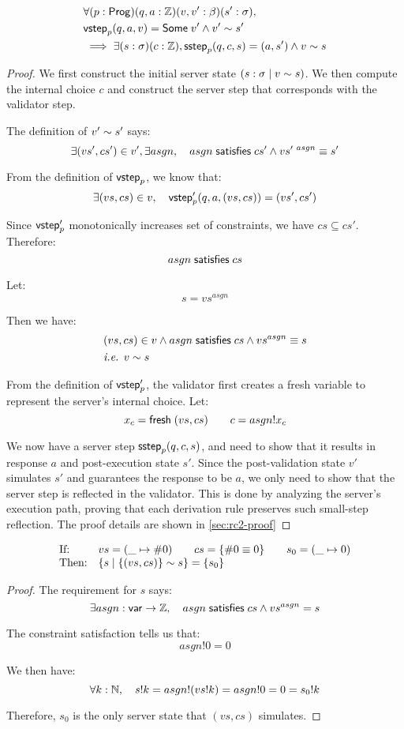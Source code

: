 \begin{lemma}[\ref{eq:rc2}]
\begin{align*}
&\forall(p:\mathsf{Prog})(q,a:\mathbb Z)(v,v':\beta)(s':\sigma),\\
&\mathsf{vstep}_p(q,a,v)=\mathsf{Some}\;v'\wedge v'\sim s'\\
&\implies\exists(s:\sigma)(c:\mathbb Z),\mathsf{sstep}_p(q,c,s)=(a,s')\wedge v\sim s
\end{align*}
\begin{proof}
We first construct the initial server state $(s:\sigma\mid v\sim s)$.  We
then compute the internal choice $c$ and construct the server step that
corresponds with the validator step.

The definition of $v'\sim s'$ says:
\[\exists (vs',cs')\in v',\exists asgn,\quad asgn\;\mathsf{satisfies}\;cs'\wedge vs'^{~asgn}\equiv s'\]

From the definition of $\mathsf{vstep}_p$, we know that:
\[\exists (vs,cs)\in v,\quad \mathsf{vstep}'_p(q,a,(vs,cs))=(vs',cs')\]

Since $\mathsf{vstep}'_p$ monotonically increases set of constraints, we have
$cs\subseteq cs'$.  Therefore: \[asgn\;\mathsf{satisfies}\;cs\]

Let: \[s=vs^{asgn}\]

Then we have:
\begin{align*}
&(vs,cs)\in v\wedge asgn\;\mathsf{satisfies}\;cs\wedge vs^{asgn}\equiv s\\
&\textit{i.e. }v\sim s
\end{align*}

From the definition of $\mathsf{vstep}'_p$, the validator first creates a fresh variable
to represent the server's internal choice.  Let:
\[x_c=\mathsf{fresh}\;(vs,cs)\qquad c=asgn!x_c\]

We now have a server step $\mathsf{sstep}_p(q,c,s)$, and need to show that it results in
response $a$ and post-execution state $s'$.  Since the post-validation state
$v'$ simulates $s'$ and guarantees the response to be $a$, we only need to show
that the server step is reflected in the validator.  This is done by analyzing
the server's execution path, proving that each derivation rule preserves such
small-step reflection.  The proof details are shown in \autoref{sec:rc2-proof}
\end{proof}
\end{lemma}

\begin{lemma}[\ref{eq:rc3}]
\[\begin{array}{ll}
\text{If:}&
vs=(\_\mapsto\#0)\qquad
cs=\{\#0\equiv0\}\qquad
s_0=(\_\mapsto0)\\
\text{Then:}&\{s\mid\{(vs,cs)\}\sim s\}=\{s_0\}
\end{array}\]
\begin{proof}
The requirement for $s$ says:
\[\exists asgn:\mathsf{var}\to\mathbb Z,\quad asgn\;\mathsf{satisfies}\;cs\wedge vs^{asgn}=s\]

The constraint satisfaction tells us that:
\[asgn!0=0\]

We then have:
\[\forall k:\mathbb N,\quad s!k=asgn!(vs!k)=asgn!0=0=s_0!k\]

Therefore, $s_0$ is the only server state that $(vs,cs)$ simulates.
\end{proof}
\end{lemma}

